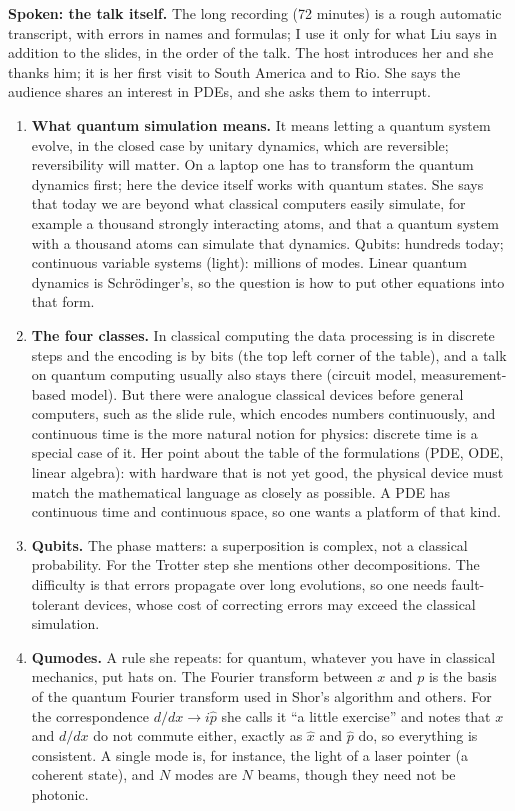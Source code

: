 \medskip\noindent
{\bf Spoken: the talk itself.}
The long recording (72 minutes) is a rough
automatic transcript, with errors in names and
formulas; I use it only for what Liu says in
addition to the slides, in the order of the
talk. The host introduces her and she thanks
him; it is her first visit to South America
and to Rio. She says the audience shares an
interest in PDEs, and she asks them to
interrupt.
\begin{enumerate}
\item {\bf What quantum simulation means.}
It means letting a quantum system evolve, in
the closed case by unitary dynamics, which are
reversible; reversibility will matter. On a
laptop one has to transform the quantum
dynamics first; here the device itself works
with quantum states. She says that today we
are beyond what classical computers easily
simulate, for example a thousand strongly
interacting atoms, and that a quantum system
with a thousand atoms can simulate that
dynamics. Qubits: hundreds today; continuous
variable systems (light): millions of modes.
Linear quantum dynamics is Schr\"odinger's, so
the question is how to put other equations
into that form.

\item {\bf The four classes.} In classical
computing the data processing is in
discrete steps and the encoding is by bits
(the top left corner of the table), and a
talk on quantum computing usually also stays
there (circuit model, measurement-based
model). But there were analogue classical
devices before general computers, such as the
slide rule, which encodes numbers
continuously, and continuous time is the more
natural notion for physics: discrete time is
a special case of it. Her point about the
table of the formulations (PDE, ODE, linear
algebra): with hardware that is not yet good,
the physical device must match the
mathematical language as closely as possible.
A PDE has continuous time and continuous
space, so one wants a platform of that kind.

\item {\bf Qubits.} The phase matters:
a superposition is complex, not a classical
probability. For the Trotter step she mentions
other decompositions. The difficulty is that
errors propagate over long evolutions, so one
needs fault-tolerant devices, whose cost of
correcting errors may exceed the classical
simulation.

\item {\bf Qumodes.} A rule she repeats: for
quantum, whatever you have in classical
mechanics, put hats on. The Fourier transform
between $x$ and $p$ is the basis of the
quantum Fourier transform used in Shor's
algorithm and others. For the correspondence
$d/dx\to i\hat p$ she calls it ``a little
exercise'' and notes that $x$ and $d/dx$ do not
commute either, exactly as $\hat x$ and
$\hat p$ do, so everything is consistent. A
single mode is, for instance, the light of a
laser pointer (a coherent state), and $N$ modes
are $N$ beams, though they need not be
photonic.


\end{enumerate}
